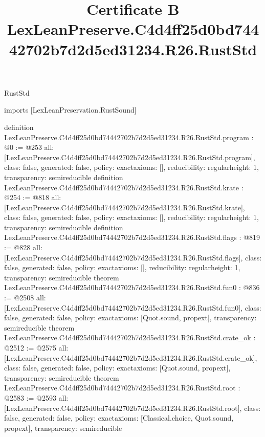 \begin{lexlean}{RustStd}
\title{Certificate B LexLeanPreserve.C4d4ff25d0bd74442702b7d2d5ed31234.R26.RustStd}
\begin{coremodule}
imports [LexLeanPreservation.RustSound]

definition LexLeanPreserve.C4d4ff25d0bd74442702b7d2d5ed31234.R26.RustStd.program : @0 := @253 {
  all: [LexLeanPreserve.C4d4ff25d0bd74442702b7d2d5ed31234.R26.RustStd.program],
  class: false,
  generated: false,
  policy: exact{axioms: []},
  reducibility: regular{height: 1},
  transparency: semireducible
}
definition LexLeanPreserve.C4d4ff25d0bd74442702b7d2d5ed31234.R26.RustStd.krate : @254 := @818 {
  all: [LexLeanPreserve.C4d4ff25d0bd74442702b7d2d5ed31234.R26.RustStd.krate],
  class: false,
  generated: false,
  policy: exact{axioms: []},
  reducibility: regular{height: 1},
  transparency: semireducible
}
definition LexLeanPreserve.C4d4ff25d0bd74442702b7d2d5ed31234.R26.RustStd.flags : @819 := @828 {
  all: [LexLeanPreserve.C4d4ff25d0bd74442702b7d2d5ed31234.R26.RustStd.flags],
  class: false,
  generated: false,
  policy: exact{axioms: []},
  reducibility: regular{height: 1},
  transparency: semireducible
}
theorem LexLeanPreserve.C4d4ff25d0bd74442702b7d2d5ed31234.R26.RustStd.fun0 : @836 := @2508 {
  all: [LexLeanPreserve.C4d4ff25d0bd74442702b7d2d5ed31234.R26.RustStd.fun0],
  class: false,
  generated: false,
  policy: exact{axioms: [Quot.sound, propext]},
  transparency: semireducible
}
theorem LexLeanPreserve.C4d4ff25d0bd74442702b7d2d5ed31234.R26.RustStd.crate_ok : @2512 := @2575 {
  all: [LexLeanPreserve.C4d4ff25d0bd74442702b7d2d5ed31234.R26.RustStd.crate_ok],
  class: false,
  generated: false,
  policy: exact{axioms: [Quot.sound, propext]},
  transparency: semireducible
}
theorem LexLeanPreserve.C4d4ff25d0bd74442702b7d2d5ed31234.R26.RustStd.root : @2583 := @2593 {
  all: [LexLeanPreserve.C4d4ff25d0bd74442702b7d2d5ed31234.R26.RustStd.root],
  class: false,
  generated: false,
  policy: exact{axioms: [Classical.choice, Quot.sound, propext]},
  transparency: semireducible
}


\end{coremodule}
\end{lexlean}
